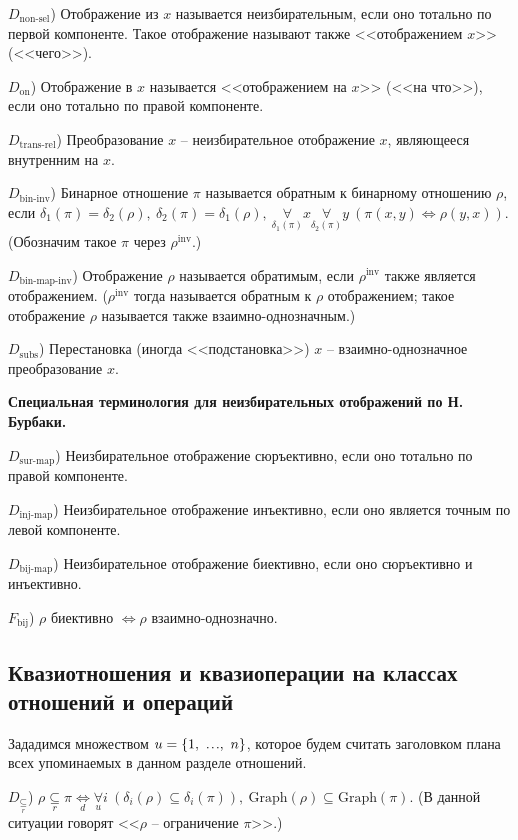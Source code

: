 \documentclass[a4paper]{article}
\newcommand\mydots{\hbox to 1em{.\hss.\hss.}}
\newcommand{\Def}[0]{\underset{d}{\Leftrightarrow}}
\newcommand{\subseteqr}[0]{\underset{r}{\subseteq}} %
\newcommand{\Graph}[1]{\mathrm{Graph}(#1)}
\begin{document}
$D_\text{non-sel}$) Отображение из $x$ называется неизбирательным, если оно тотально по первой компоненте. Такое отображение называют также <<отображением $x$>> (<<чего>>).

$D_\text{on}$) Отображение в $x$ называется <<отображением на $x$>> (<<на что>>), если оно тотально по правой компоненте.

$D_\text{trans-rel}$) Преобразование $x$ -- неизбирательное отображение $x$, являющееся внутренним на $x$.

$D_\text{bin-inv}$) Бинарное отношение $\pi$ называется обратным к бинарному отношению $\rho$, если $\delta_1(\pi) = \delta_2(\rho),~ \delta_2(\pi) = \delta_1(\rho),~ \underset{\delta_1(\pi)}{\forall} x \underset{\delta_2(\pi)}{\forall} y~ (\pi(x, y) \Leftrightarrow \rho(y, x))$. (Обозначим такое $\pi$ через $\rho^\text{inv}$.)

$D_\text{bin-map-inv}$) Отображение $\rho$ называется обратимым, если $\rho^\text{inv}$ также является отображением. ($\rho^\text{inv}$ тогда называется обратным к $\rho$ отображением; такое отображение $\rho$ называется также взаимно-однозначным.)

$D_\text{subs}$) Перестановка (иногда <<подстановка>>) $x$ -- взаимно-однозначное преобразование $x$.

\textbf{Специальная терминология для неизбирательных отображений по Н. Бурбаки.}

$D_\text{sur-map}$) Неизбирательное отображение сюръективно, если оно тотально по правой компоненте.

$D_\text{inj-map}$) Неизбирательное отображение инъективно, если оно является точным по левой компоненте.

$D_\text{bij-map}$) Неизбирательное отображение биективно, если оно сюръективно и инъективно.

$F_\text{bij}$) $\rho$ биективно $\Leftrightarrow \rho$ взаимно-однозначно.

\subsection{Квазиотношения и квазиоперации на классах отношений и операций}

Зададимся множеством $u = \{ 1,~ \mydots,~ n \}$, которое будем считать заголовком плана всех упоминаемых в данном разделе отношений.

$D_{\subseteqr}$) $\rho \subseteqr \pi \Def \underset{u}{\forall} i~ (\delta_i(\rho) \subseteq \delta_i(\pi)),~ \Graph{\rho} \subseteq \Graph{\pi}$. (В данной ситуации говорят <<$\rho$ -- ограничение $\pi$>>.)
\end{document}
